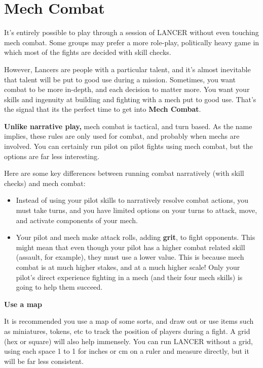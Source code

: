 \chapter{Mech Combat}
It’s entirely possible to play through a session of LANCER without even touching mech combat. Some groups may prefer a more role-play, politically heavy game in which most of the fights are decided with skill checks.

However, Lancers are people with a particular talent, and it’s almost inevitable that talent will be put to good use during a mission. Sometimes, you want combat to be more in-depth, and each decision to matter more. You want your skills and ingenuity at building and fighting with a mech put to good use. That’s the signal that its the perfect time to get into \textbf{Mech Combat}.

\textbf{Unlike narrative play,} mech combat is tactical, and turn based. As the name implies, these rules are only used for combat, and probably when mechs are involved. You can certainly run pilot on pilot fights using mech combat, but the options are far less interesting. 

Here are some key differences between running combat narratively (with skill checks) and mech combat:
\begin{itemize}
    \item Instead of using your pilot skills to narratively resolve combat actions, you must take turns, and you have limited options on your turns to attack, move, and activate components of your mech.
    \item Your pilot and mech make attack rolls, adding \textbf{grit}, to fight opponents. This might mean that even though your pilot has a higher combat related skill (assault, for example), they must use a lower value. This is because mech combat is at much higher stakes, and at a much higher scale! Only your pilot’s direct experience fighting in a mech (and their four mech skills) is going to help them succeed.
\end{itemize}

\begin{center}
\textbf{Use a map}
\end{center}

It is recommended you use a map of some sorts, and draw out or use items such as miniatures, tokens, etc to track the position of players during a fight. A grid (hex or square) will also help immensely. You can run LANCER without a grid, using each space 1 to 1 for inches or cm on a ruler and measure directly, but it will be far less consistent.

